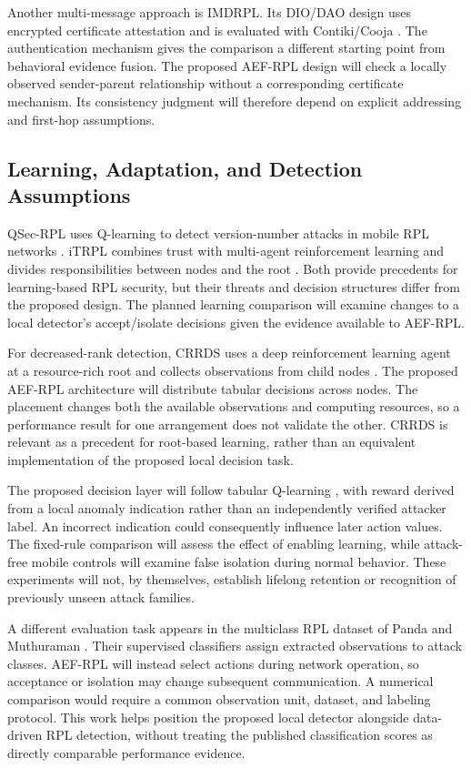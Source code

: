 \documentclass[journal]{IEEEtran}
\begin{document}
Another multi-message approach is IMDRPL. Its DIO/DAO design uses encrypted certificate attestation and is evaluated with Contiki/Cooja \cite{imdrpl2023}. The authentication mechanism gives the comparison a different starting point from behavioral evidence fusion. The proposed AEF-RPL design will check a locally observed sender-parent relationship without a corresponding certificate mechanism. Its consistency judgment will therefore depend on explicit addressing and first-hop assumptions.

\subsection{Learning, Adaptation, and Detection Assumptions}
QSec-RPL uses Q-learning to detect version-number attacks in mobile RPL networks \cite{qsecrpl2023}. iTRPL combines trust with multi-agent reinforcement learning and divides responsibilities between nodes and the root \cite{itrpl2024}. Both provide precedents for learning-based RPL security, but their threats and decision structures differ from the proposed design. The planned learning comparison will examine changes to a local detector's accept/isolate decisions given the evidence available to AEF-RPL.

For decreased-rank detection, CRRDS uses a deep reinforcement learning agent at a resource-rich root and collects observations from child nodes \cite{haqdad2026}. The proposed AEF-RPL architecture will distribute tabular decisions across nodes. The placement changes both the available observations and computing resources, so a performance result for one arrangement does not validate the other. CRRDS is relevant as a precedent for root-based learning, rather than an equivalent implementation of the proposed local decision task.

The proposed decision layer will follow tabular Q-learning \cite{watkins1992}, with reward derived from a local anomaly indication rather than an independently verified attacker label. An incorrect indication could consequently influence later action values. The fixed-rule comparison will assess the effect of enabling learning, while attack-free mobile controls will examine false isolation during normal behavior. These experiments will not, by themselves, establish lifelong retention or recognition of previously unseen attack families.

A different evaluation task appears in the multiclass RPL dataset of Panda and Muthuraman \cite{panda2026}. Their supervised classifiers assign extracted observations to attack classes. AEF-RPL will instead select actions during network operation, so acceptance or isolation may change subsequent communication. A numerical comparison would require a common observation unit, dataset, and labeling protocol. This work helps position the proposed local detector alongside data-driven RPL detection, without treating the published classification scores as directly comparable performance evidence.
\end{document}
